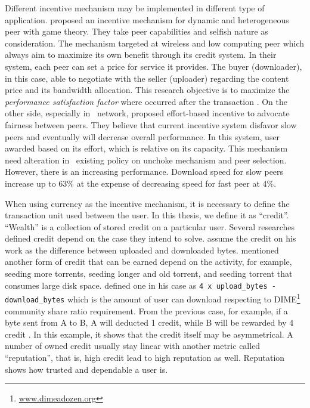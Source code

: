 Different incentive mechanism may be implemented in different type of application. \citeauthor{2015:incentivep2pgame:kang} proposed an incentive mechanism for dynamic and heterogeneous peer with game theory. They take peer capabilities and selfish nature as consideration. The mechanism targeted at wireless and low computing peer which always aim to maximize its own benefit through its credit system. In their system, each peer can set a price for service it provides. The buyer (downloader), in this case, able to negotiate with the seller (uploader) regarding the content price and its bandwidth allocation. This research objective is to maximize the \textit{performance satisfaction factor} where occurred after the transaction \cite{2015:incentivep2pgame:kang}. On the other side, especially in \bt~network, \citeauthor{2010:effortincentive:rahman} proposed effort-based incentive to advocate fairness between peers. They believe that current incentive system disfavor slow peers and eventually will decrease overall performance. In this system, user awarded based on its effort, which is relative on its capacity. This mechanism need alteration in \bt~existing policy on unchoke mechanism and peer selection. However, there is an increasing performance. Download speed for slow peers increase up to 63\% at the expense of decreasing speed for fast peer at 4\%.

When using currency as the incentive mechanism, it is necessary to define the transaction unit used between the user. In this thesis, we define it as ``credit''. ``Wealth'' is a collection of stored credit on a particular user. Several researches defined credit depend on the case they intend to solve. \citeauthor{2015:creditmining:capota} assume the credit on his work as the difference between uploaded and downloaded bytes. \citeauthor{2014:sustainabilitytorrent:chen} mentioned another form of credit that can be earned depend on the activity, for example, seeding more torrents, seeding longer and old torrent, and seeding torrent that consumes large disk space\cite{2014:sustainabilitytorrent:chen}. \citeauthor{2012:economicbt:kash} defined one in his case as \texttt{4 x upload\_bytes - download\_bytes} which is the amount of user can download respecting to DIME\footnote{\url{www.dimeadozen.org}} community share ratio requirement. From the previous case, for example, if a byte sent from A to B, A will deducted 1 credit, while B will be rewarded by 4 credit \cite{2012:economicbt:kash}. In this example, it shows that the credit itself may be asymmetrical. A number of owned credit usually stay linear with another metric called ``reputation'', that is, high credit lead to high reputation as well. Reputation shows how trusted and dependable a user is. 

